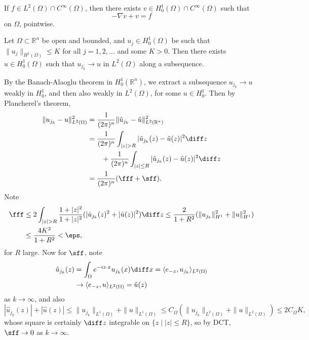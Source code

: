 \documentclass[12pt]{article}
\begin{document}
\begin{corollary}
	If $f \in L^2(\Omega)\cap C^\infty(\Omega)$, then there exists $v \in H^1_0(\Omega) \cap C^\infty(\Omega)$ such that
	\[
	- \nabla v + v = f
	\]
	on $\Omega$, pointwise.
\end{corollary}

\begin{theorem}
	Let $\Omega \subset \mathbb{R}^n$ be open and bounded, and $u_j \in H^1_0(\Omega)$ be such that $\|u_j\|_{H^1(\Omega)} \leq K$ for all $j = 1, 2, \ldots$ and some $K > 0$. Then there exists $u \in H^1_0(\Omega)$ such that $u_{j_k} \to u$ in $L^2(\Omega)$ along a subsequence.
\end{theorem}

\begin{proofbox}
	By the Banach-Alaoglu theorem in $H^1_0(\mathbb{R}^n)$, we extract a subsequence $u_{j_k} \to u$ weakly in $H^1_0$, and then also weakly in $L^2(\Omega)$, for some $u \in H^1_0$. Then by Plancherel's theorem,
	\begin{align*}
		\|u_{j_k} - u\|^2_{L^2(\Omega)} &= \frac{1}{(2 \pi)^n} \|\hat u_{j_k} - \hat u\|^2_{L^2(\mathbb{R}^n)} \\
						&= \frac{1}{(2 \pi)^n} \int_{|z| > R} |\hat u_{j_k}(z) - \hat u(z)|^2 \diff z \\
						&\qquad+ \frac{1}{(2 \pi)^n} \int_{|z| \leq R} |\hat u_{j_k}(z) - \hat u(z)|^2 \diff z \\
						&= \frac{1}{(2 \pi)^n}(\fff + \sff).
	\end{align*}
	Note
	\begin{align*}
		\fff &\leq 2 \int_{|z| > R} \frac{1 + |z|^2}{1 + |z|^2}(|\hat u_{j_k}(z)^2 + |\hat u(z)|^2 ) \diff z \leq \frac{2}{1 + R^2} (\|u_{j_k}\|^2_{H^1} + \|u\|^2_{H^1}) \\
		     &\leq \frac{4 K^2}{1 + R^2} < \eps,
	\end{align*}
	for $R$ large. Now for $\sff$, note
	\begin{align*}
		\hat u_{j_k}(z) &= \int_{\Omega} e^{-i z \cdot x} u_{j_k}(x) \diff x = \langle e_{-z}, u_{j_k} \rangle_{L^2(\Omega)} \\
				&\to \langle e_{-z}, u \rangle_{L^2(\Omega)} = \hat u(z)
	\end{align*}
	as $k \to \infty$, and also
	\[
	|\hat u_{j_k}(z)| + |\hat u(z)| \leq \|u_{j_k}\|_{L^1(\Omega)} + \|u\|_{L^1(\Omega)} \leq C_{\Omega}( \|u_{j_k}\|_{L^2(\Omega)} + \|u\|_{L^2(\Omega)}) \leq 2 C_{\Omega} K,
	\]
	whose square is certainly $\diff z$ integrable on $\{z \mid |z | \leq R\}$, so by DCT, $\sff \to 0$ as $k \to \infty$.
\end{proofbox}
\end{document}
